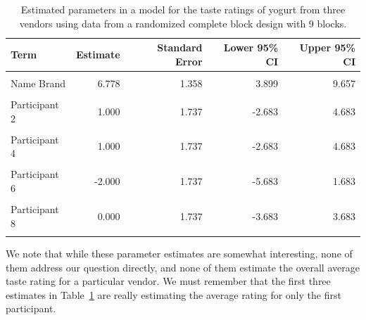 \documentclass[
  letterpaper,
  DIV=11,
  numbers=noendperiod]{scrreprt}
\theoremstyle{definition}
\theoremstyle{definition}
\theoremstyle{plain}
\theoremstyle{remark}
\begin{document}
\hypertarget{tbl-blockconditions-summary}{}
\begin{table}
\caption{\label{tbl-blockconditions-summary}Estimated parameters in a model for the taste ratings of yogurt from
three vendors using data from a randomized complete block design with 9
blocks. }\tabularnewline

\centering
\begin{tabular}[t]{lrrrr}
\toprule
Term & Estimate & Standard Error & Lower 95\% CI & Upper 95\% CI\\
\midrule
\cellcolor{gray!6}{East Side Yogurt} & \cellcolor{gray!6}{7.000} & \cellcolor{gray!6}{1.358} & \cellcolor{gray!6}{4.121} & \cellcolor{gray!6}{9.879}\\
Name Brand & 6.778 & 1.358 & 3.899 & 9.657\\
\cellcolor{gray!6}{South Side Yogurt} & \cellcolor{gray!6}{6.222} & \cellcolor{gray!6}{1.358} & \cellcolor{gray!6}{3.343} & \cellcolor{gray!6}{9.101}\\
Participant 2 & 1.000 & 1.737 & -2.683 & 4.683\\
\cellcolor{gray!6}{Participant 3} & \cellcolor{gray!6}{1.000} & \cellcolor{gray!6}{1.737} & \cellcolor{gray!6}{-2.683} & \cellcolor{gray!6}{4.683}\\
\addlinespace
Participant 4 & 1.000 & 1.737 & -2.683 & 4.683\\
\cellcolor{gray!6}{Participant 5} & \cellcolor{gray!6}{0.333} & \cellcolor{gray!6}{1.737} & \cellcolor{gray!6}{-3.350} & \cellcolor{gray!6}{4.016}\\
Participant 6 & -2.000 & 1.737 & -5.683 & 1.683\\
\cellcolor{gray!6}{Participant 7} & \cellcolor{gray!6}{2.667} & \cellcolor{gray!6}{1.737} & \cellcolor{gray!6}{-1.016} & \cellcolor{gray!6}{6.350}\\
Participant 8 & 0.000 & 1.737 & -3.683 & 3.683\\
\addlinespace
\cellcolor{gray!6}{Participant 9} & \cellcolor{gray!6}{-2.000} & \cellcolor{gray!6}{1.737} & \cellcolor{gray!6}{-5.683} & \cellcolor{gray!6}{1.683}\\
\bottomrule
\end{tabular}
\end{table}

We note that while these parameter estimates are somewhat interesting,
none of them address our question directly, and none of them estimate
the overall average taste rating for a particular vendor. We must
remember that the first three estimates in
Table~\ref{tbl-blockconditions-summary} are really estimating the
average rating for only the first participant.
\end{document}
